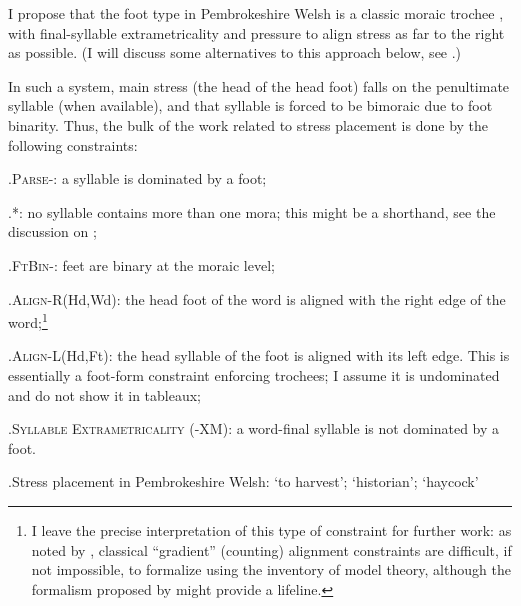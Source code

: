 I propose that the foot type in Pembrokeshire Welsh is a classic moraic trochee \citep{prince92:_quant,mester94:_quant_troch_latin,hayes1995}, with final\hyp syllable extrametricality and pressure to align stress as far to the right as possible. (I will discuss some alternatives to this approach below, see .)

In such a system, main stress (\ie the head of the head foot) falls on the penultimate syllable (when available), and that syllable is forced to be bimoraic due to foot binarity. Thus, the bulk of the work related to stress placement is done by the following constraints:

\ex.\textsc{Parse}-: a syllable is dominated by a foot;

\ex.\textsc{*\mo\mo}: no syllable contains more than one mora; this might be a shorthand, see the discussion on ;

\ex.\textsc{FtBin}-: feet are binary at the moraic level;

\ex.\textsc{Align-R}(Hd,Wd): the head foot of the word is aligned with the right edge of the word;\footnote{I leave the precise interpretation of this type of constraint for further work: as noted by \citet{potts02:_model_ot}, classical \enquote{gradient} (\ie counting) alignment constraints are difficult, if not impossible, to formalize using the inventory of model theory, although the formalism proposed by \citet{hyde08:_align_contin,hyde12:_align} might provide a lifeline.}

\ex.\textsc{Align-L}(Hd,Ft): the head syllable of the foot is aligned with its left edge. This is essentially a foot-form constraint enforcing trochees; I assume it is undominated and do not show it in tableaux;

\ex.\textsc{Syllable Extrametricality} (\sy-\textsc{XM}): a word-final syllable is not dominated by a foot.

\ex.\label{pw-stress-tablea}Stress placement in Pembrokeshire Welsh: \ipa{[kineˈjaːvi]} `to harvest'; \ipa{[haˈneːsið]} `historian'; \ipa{[ˈmuːdul]} `haycock'\\

